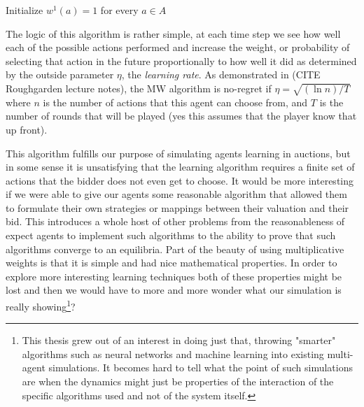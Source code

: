 \documentclass[12pt,twoside]{reedthesis}
\begin{document}
\begin{algorithm}[H]
	Initialize $w^1(a) = 1$ for every $a\in A$\\
\end{algorithm}
\vspace{1cm}
The logic of this algorithm is rather simple, at each time step we see how well each of the possible actions performed and increase the weight, or probability of selecting that action in the future proportionally to how well it did as determined by the outside parameter $\eta$, the \textit{learning rate}. As demonstrated in (CITE Roughgarden lecture notes), the MW algorithm is no-regret if $\eta = \sqrt{(\ln n) / T}$ where $n$ is the number of actions that this agent can choose from, and $T$ is the number of rounds that will be played (yes this assumes that the player know that up front).

This algorithm fulfills our purpose of simulating agents learning in auctions, but in some sense it is unsatisfying that the learning algorithm requires a finite set of actions that the bidder does not even get to choose. It would be more interesting if we were able to give our agents some reasonable algorithm that allowed them to formulate their own strategies or mappings between their valuation and their bid. This introduces a whole host of other problems from the reasonableness of expect agents to implement such algorithms to the ability to prove that such algorithms converge to an equilibria. Part of the beauty of using multiplicative weights is that it is simple and had nice mathematical properties. In order to explore more interesting learning techniques both of these properties might be lost and then we would have to more and more wonder what our simulation is really showing\footnote{This thesis grew out of an interest in doing just that, throwing "smarter" algorithms such as neural networks and machine learning into existing multi-agent simulations. It becomes hard to tell what the point of such simulations are when the dynamics might just be properties of the interaction of the specific algorithms used and not of the system itself.}?
\end{document}
